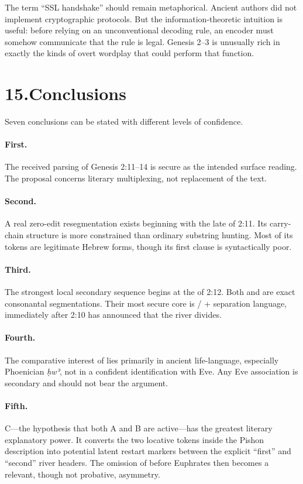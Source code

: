 The term ``SSL handshake'' should remain metaphorical.  Ancient authors did not implement cryptographic protocols.  But the information-theoretic intuition is useful: before relying on an unconventional decoding rule, an encoder must somehow communicate that the rule is legal.  Genesis 2--3 is unusually rich in exactly the kinds of overt wordplay that could perform that function.

\section*{15.\quad Conclusions}

Seven conclusions can be stated with different levels of confidence.

\paragraph{First.}
The received parsing of Genesis 2:11--14 is secure as the intended surface reading.  The proposal concerns literary multiplexing, not replacement of the text.

\paragraph{Second.}
A real zero-edit resegmentation exists beginning with the late  of 2:11.  Its carry-chain structure is more constrained than ordinary substring hunting.  Most of its tokens are legitimate Hebrew forms, though its first clause is syntactically poor.

\paragraph{Third.}
The strongest local secondary sequence begins at the  of 2:12.  Both  and  are exact consonantal segmentations.  Their most secure core is / + separation language, immediately after 2:10 has announced that the river divides.

\paragraph{Fourth.}
The comparative interest of  lies primarily in ancient life-language, especially Phoenician \textit{ḥwʾ}, not in a confident identification with Eve.  Any Eve association is secondary and should not bear the argument.

\paragraph{Fifth.}
C---the hypothesis that both A and B are active---has the greatest literary explanatory power.  It converts the two locative  tokens inside the Pishon description into potential latent restart markers between the explicit ``first'' and ``second'' river headers.  The omission of  before Euphrates then becomes a relevant, though not probative, asymmetry.


